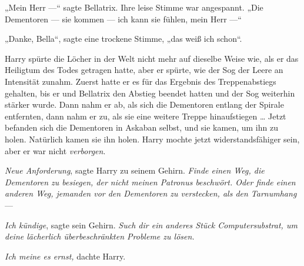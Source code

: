 „Mein Herr —“ sagte Bellatrix. Ihre leise Stimme war angespannt.
„Die Dementoren — sie kommen — ich kann sie fühlen, mein Herr —“

„Danke, Bella“, sagte eine trockene Stimme, „das weiß ich schon“.

Harry spürte die Löcher in der Welt nicht mehr auf dieselbe Weise wie, als er das Heiligtum des Todes getragen hatte, aber er spürte, wie der Sog der Leere an Intensität zunahm. Zuerst hatte er es für das Ergebnis des Treppenabstiegs gehalten, bis er und Bellatrix den Abstieg beendet hatten und der Sog weiterhin stärker wurde. Dann nahm er ab, als sich die Dementoren entlang der Spirale entfernten, dann nahm er zu, als sie eine weitere Treppe hinaufstiegen … Jetzt befanden sich die Dementoren in Askaban selbst, und sie kamen, um ihn zu holen. Natürlich kamen sie ihn holen. Harry mochte jetzt widerstandsfähiger sein, aber er war nicht \emph{verborgen}.

\emph{Neue Anforderung}, sagte Harry zu seinem Gehirn. \emph{Finde einen Weg, die Dementoren zu besiegen, der nicht meinen Patronus beschwört. Oder finde einen anderen Weg, jemanden vor den Dementoren zu verstecken, als den Tarnumhang} —

\emph{Ich kündige}, sagte sein Gehirn. \emph{Such dir ein anderes Stück Computersubstrat, um deine lächerlich überbeschränkten Probleme zu lösen.}

\emph{Ich meine es ernst,} dachte Harry.


